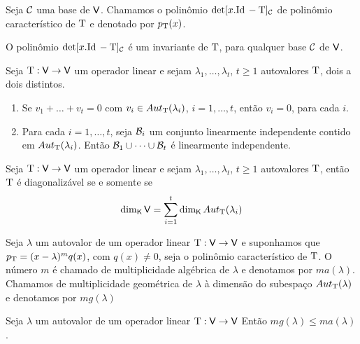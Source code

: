 \documentclass[10pt,a4paper]{book}
\begin{document}
\begin{definition}
	Seja $\mathcal{ C }$ uma base de $\mathsf{ V }$. Chamamos o polinômio $\det [x.\mathrm{ Id }\, - \mathrm{ T }]_{\mathcal{ C }}$ de polinômio característico de $\mathrm{ T }$ e denotado por $p_{\mathrm{ T }}(x)$.
\end{definition}

\begin{lemma}
	O polinômio $\det [x.\mathrm{ Id }\, - \mathrm{ T }]_{\mathcal{ C }}$ é um invariante de $\mathrm{ T }$, para qualquer base $\mathcal{ C }$ de $\mathsf{ V }$.
\end{lemma}

\begin{theorem}
	Seja $\mathrm{ T } : \mathsf{ V } \rightarrow \mathsf{ V } $ um operador linear e sejam $\lambda_1, \dots, \lambda_t$, $t \geq 1$ autovalores $\mathrm{ T }$, dois a dois distintos.
	\begin{enumerate}
		\item Se $v_1 + \dots + v_t = 0$ com $v_i \in Aut_{\mathrm{ T }}(\lambda_i)$, $i = 1, \dots, t$, então $v_i = 0$, para cada $i$.
		\item Para cada $i = 1, \dots, t$, seja $\mathcal{ B }_i$ um conjunto linearmente independente contido em $Aut_{\mathrm{ T }}(\lambda_i)$. Então $\mathcal{ B }_1 \cup \dots \cup \mathcal{ B }_t$ é linearmente independente.
	\end{enumerate}
\end{theorem}

\begin{corollary}
	Seja $\mathrm{ T } : \mathsf{ V } \rightarrow \mathsf{ V } $ um operador linear e sejam $\lambda_1, \dots, \lambda_t$, $t \geq 1$ autovalores $\mathrm{ T }$, então $\mathrm{ T }$ é diagonalizável se e somente se 
	\[
		\dim_{\mathsf{ K }} \mathsf{ V } = \sum_{i = 1}^{t} \dim_{\mathsf{ K }} Aut_{\mathrm{ T }}(\lambda_i)
	\]
\end{corollary}

\begin{definition}
	Seja $\lambda$ um autovalor de um operador linear $\mathrm{ T } : \mathsf{ V } \rightarrow \mathsf{ V }$ e suponhamos que $p_{\mathrm{ T }} = (x - \lambda)^m q(x)$, com $q(x) \neq 0$, seja o polinômio característico de $\mathrm{ T }$. O número $m$ é chamado de multiplicidade algébrica de $\lambda$ e denotamos por $ma(\lambda)$. Chamamos de multiplicidade geométrica de $\lambda$ à dimensão do subespaço $Aut_{\mathrm{ T }}(\lambda)$ e denotamos por $mg(\lambda)$
\end{definition}

\begin{proposition}
	Seja $\lambda$ um autovalor de um operador linear $\mathrm{ T } : \mathsf{ V } \rightarrow \mathsf{ V }$ Então $mg(\lambda) \leq ma(\lambda)$.
\end{proposition}
\end{document}
